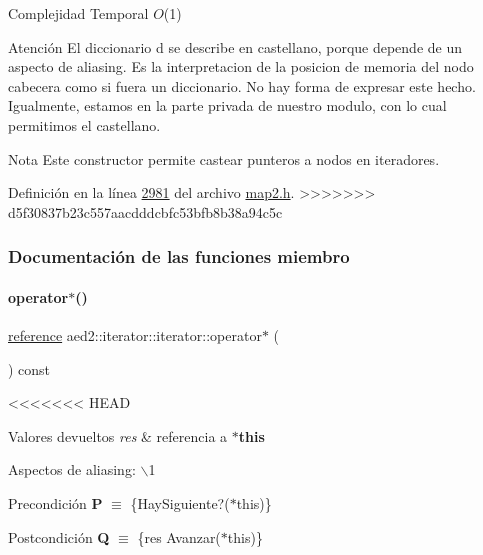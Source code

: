 \begin{DoxyDescription}
\item[Complejidad Temporal]$O$(1)
\end{DoxyDescription}

\begin{DoxyAttention}{Atención}
El diccionario {\ttfamily d} se describe en castellano, porque depende de un aspecto de aliasing. Es la interpretacion de la posicion de memoria del nodo cabecera como si fuera un diccionario. No hay forma de expresar este hecho. Igualmente, estamos en la parte privada de nuestro modulo, con lo cual permitimos el castellano.
\end{DoxyAttention}
\begin{DoxyNote}{Nota}
Este constructor permite castear punteros a nodos en iteradores. 
\end{DoxyNote}


Definición en la línea \hyperlink{map2_8h_source_l02981}{2981} del archivo \hyperlink{map2_8h_source}{map2.\+h}.
>>>>>>> d5f30837b23c557aacdddcbfc53bfb8b38a94c5c



\subsubsection{Documentación de las funciones miembro}
\mbox{\label{classaed2_1_1iterator_1_1iterator_a5d87de9e96d5efd0456e8f7aec240b8d_a5d87de9e96d5efd0456e8f7aec240b8d}} 
\paragraph{\texorpdfstring{operator$\ast$()}{operator*()}}
{\footnotesize\ttfamily \hyperlink{classaed2_1_1iterator_1_1iterator_a91be74b60dfc3eabfa5a69d9aa068959_a91be74b60dfc3eabfa5a69d9aa068959}{reference} aed2\+::iterator\+::iterator\+::operator$\ast$ (\begin{DoxyParamCaption}{ }\end{DoxyParamCaption}) const\hspace{0.3cm}{\ttfamily [inline]}}

<<<<<<< HEAD
\begin{DoxyRetVals}{\-Valores devueltos}
{\em res} & referencia a {\bfseries $\ast$this}\\
\hline
\end{DoxyRetVals}
\begin{DoxyParagraph}{\-Aspectos de aliasing\-:}
$\backslash$1
\end{DoxyParagraph}
\begin{DoxyPrecond}{\-Precondición}
{\bfseries \-P} $\equiv$ \{\-Hay\-Siguiente?($\ast$this)\} 
\end{DoxyPrecond}
\begin{DoxyPostcond}{\-Postcondición}
{\bfseries \-Q} $\equiv$ \{res  \-Avanzar($\ast$this)\}
\end{DoxyPostcond}


